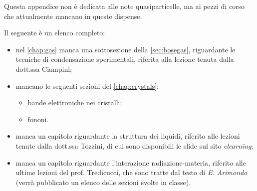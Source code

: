 
Questa appendice non è dedicata alle note quasiparticelle, ma ai pezzi di corso che attualmente mancano in queste dispense.

Il seguente è un elenco completo:
\begin{itemize}
	\item nel \cref{chap:gas} manca una sottosezione della \cref{sec:bosegas}, riguardante le tecniche di condensazione sperimentali, riferita alla lezione tenuta dalla dott.ssa Ciampini;
	\item mancano le seguenti sezioni del \cref{chap:crystals}:
	\begin{itemize}
		\item bande elettroniche nei cristalli;
		\item fononi.
	\end{itemize}
	\item manca un capitolo riguardante la struttura dei liquidi, riferito alle lezioni tenute dalla dott.ssa Tozzini, di cui sono disponibili le slide sul sito \textit{elearning};
	\item manca un capitolo riguardante l'interazione radiazione-materia, riferito alle ultime lezioni del prof. Tredicucci, che sono tratte dal testo di \textit{E. Arimondo} (verrà pubblicato un elenco delle sezioni svolte in classe).
\end{itemize}